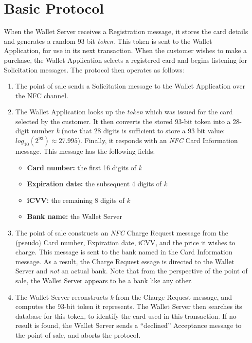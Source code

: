 \section{Basic Protocol}
\label{unlinkable-design-1}

When the Wallet Server receives a Registration message, it stores the card details and generates a random 93 bit \emph{token}.
This token is sent to the Wallet Application, for use in its next transaction.
When the customer wishes to make a purchase, the Wallet Application selects a registered card and begins listening for Solicitation messages.
The protocol then operates as follows:
\begin{enumerate}
\item The point of sale sends a Solicitation message to the Wallet Application over the NFC channel.
\item The Wallet Application looks up the \emph{token} which was issued for the card selected by the customer.
    It then converts the stored 93-bit token into a 28-digit number \emph{k}
    (note that 28 digits is sufficient to store a 93 bit value: $log_{10}(2^{93}) \approx 27.995$).
    Finally, it responds with an \emph{NFC} Card Information message.
    This message has the following fields:
    \begin{itemize}
    \item \textbf{Card number:} the first 16 digits of \emph{k}
    \item \textbf{Expiration date:} the subsequent 4 digits of \emph{k}
    \item \textbf{iCVV:} the remaining 8 digits of \emph{k}
    \item \textbf{Bank name:} the Wallet Server
   	\end{itemize}
\item The point of sale constructs an \emph{NFC} Charge Request message from the (pseudo) Card number, Expiration date, iCVV, and the price it wishes to charge.
    This message is sent to the bank named in the Card Information message.
    As a result, the Charge Request essage is directed to the Wallet Server and \emph{not} an actual bank.
    Note that from the perspective of the point of sale, the Wallet Server appears to be a bank like any other.
\item The Wallet Server reconstructs \emph{k} from the Charge Request message, and computes the 93-bit token it represents.
    The Wallet Server then searches its database for this token, to identify the card used in this transaction.
    If no result is found, the Wallet Server sends a ``declined'' Acceptance message to the point of sale, and aborts the protocol.

\end{enumerate}
